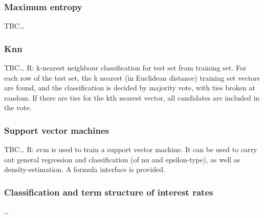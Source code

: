 
\subsubsection{Maximum entropy} %
TBC\dots

\subsubsection{Knn} %
TBC\dots
R: k-nearest neighbour classification for test set from training set. For each row of the test set, the k
nearest (in Euclidean distance) training set vectors are found, and the classification is decided by
majority vote, with ties broken at random. If there are ties for the kth nearest vector, all candidates
are included in the vote.

\subsubsection{Support vector machines} %
TBC\dots
R: svm is used to train a support vector machine. It can be used to carry out general regression and
classification (of nu and epsilon-type), as well as density-estimation. A formula interface is provided.

\subsubsection{Classification and term structure of interest rates}

\dots




